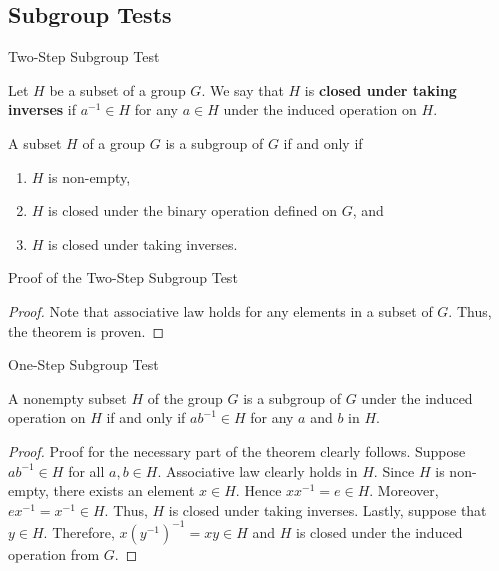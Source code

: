 \documentclass{beamer}
\begin{document}
\subsection{Subgroup Tests}

\begin{frame}{Two-Step Subgroup Test}
\begin{definition}
\justifying
Let $H$ be a subset of a group $G$. We say that $H$ is \textbf{closed under taking inverses} if $a^{-1} \in H$ for any $a \in H$ under the induced operation on $H$.
\end{definition}
\pause
\begin{theorem}
\justifying
A subset $H$ of a group $G$ is a subgroup of $G$ if and only if
\begin{enumerate}
\justifying
\item $H$ is non-empty,
\item $H$ is closed under the binary operation defined on $G$, and
\item $H$ is closed under taking inverses. 
\end{enumerate}
\end{theorem}
\end{frame}

\begin{frame}{Proof of the Two-Step Subgroup Test}
\begin{proof}
\justifying
Note that associative law holds for any elements in a subset of $G$. Thus, the theorem is proven. 
\end{proof}    
\end{frame}

\begin{frame}{One-Step Subgroup Test}
\begin{theorem}
\justifying
A nonempty subset $H$ of the group $G$ is a subgroup of $G$ under the induced operation on $H$ if and only if $ab^{-1} \in H$ for any $a$ and $b$ in $H$.
\end{theorem}
\pause
\begin{proof}
\justifying
Proof for the necessary part of the theorem clearly follows. Suppose $ab^{-1} \in H$ for all $a, b \in H$. Associative law clearly holds in $H$. Since $H$ is non-empty, there exists an element $x \in H$. Hence $xx^{-1} = e \in H$. Moreover, $ex^{-1} = x^{-1} \in H$. Thus, $H$ is closed under taking inverses. Lastly, suppose that $y \in H$. Therefore, $x\left(y^{-1}\right)^{-1} = xy \in H$ and $H$ is closed under the induced operation from $G$. 
\end{proof}
\end{frame}
\end{document}
